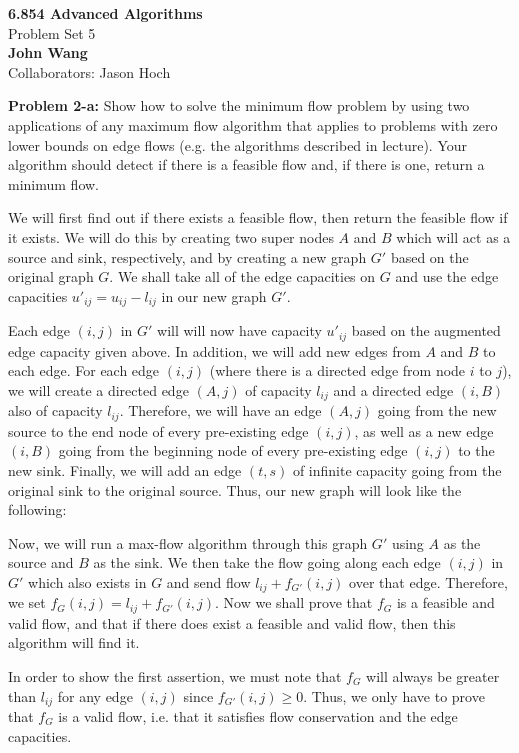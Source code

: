 \documentclass[psamsfonts]{amsart}
\newenvironment{sol}{\vspace{0.25cm}{\large \bfseries Solution:}}{\qedsymbol}
\newenvironment{prob}[1]{\begin{framed}{\large \bfseries Problem #1:}}{\end{framed}}
\newcommand{\makenewtitle}{
    \begin{center}
    {\huge \bfseries 6.854 Advanced Algorithms} \\
    Problem Set 5\\
    \vspace{0.25cm}
    {\bfseries John Wang} \\
    Collaborators: Jason Hoch
    \end{center}
    \vspace{0.5cm}
}
\begin{document}
\newpage
\makenewtitle

\begin{prob}{2-a}
Show how to solve the minimum flow problem by using two applications of any maximum flow algorithm that applies to problems with zero lower bounds on edge flows (e.g. the algorithms described in lecture). Your algorithm should detect if there is a feasible flow and, if there is one, return a minimum flow.
\end{prob}
\begin{sol}
We will first find out if there exists a feasible flow, then return the feasible flow if it exists. We will do this by creating two super nodes $A$ and $B$ which will act as a source and sink, respectively, and by creating a new graph $G'$ based on the original graph $G$. We shall take all of the edge capacities on $G$ and use the edge capacities $u'_{ij} = u_{ij} - l_{ij}$ in our new graph $G'$. 

Each edge $(i,j)$ in $G'$ will will now have capacity $u'_{ij}$ based on the augmented edge capacity given above. In addition, we will add new edges from $A$ and $B$ to each edge. For each edge $(i,j)$ (where there is a directed edge from node $i$ to $j$), we will create a directed edge $(A, j)$ of capacity $l_{ij}$ and a directed edge $(i, B)$ also of capacity $l_{ij}$. Therefore, we will have an edge $(A, j)$ going from the new source to the end node of every pre-existing edge $(i,j)$, as well as a new edge $(i, B)$ going from the beginning node of every pre-existing edge $(i,j)$ to the new sink. Finally, we will add an edge $(t,s)$ of infinite capacity going from the original sink to the original source. Thus, our new graph will look like the following:
\begin{figure}[h!]

\end{figure}

Now, we will run a max-flow algorithm through this graph $G'$ using $A$ as the source and $B$ as the sink. We then take the flow going along each edge $(i,j)$ in $G'$ which also exists in $G$ and send flow $l_{ij} + f_{G'}(i,j)$ over that edge. Therefore, we set $f_{G}(i,j) = l_{ij} + f_{G'}(i,j)$. Now we shall prove that $f_G$ is a feasible and valid flow, and that if there does exist a feasible and valid flow, then this algorithm will find it.

In order to show the first assertion, we must note that $f_G$ will always be greater than $l_{ij}$ for any edge $(i,j)$ since $f_{G'}(i,j) \geq 0$. Thus, we only have to prove that $f_G$ is a valid flow, i.e. that it satisfies flow conservation and the edge capacities. 



\end{sol}
\end{document}
